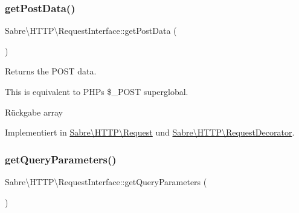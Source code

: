 \mbox{\label{interface_sabre_1_1_h_t_t_p_1_1_request_interface_ae33360454f0d43e566b76de24682af33}} 
\subsubsection{\texorpdfstring{get\+Post\+Data()}{getPostData()}}
{\footnotesize\ttfamily Sabre\textbackslash{}\+H\+T\+T\+P\textbackslash{}\+Request\+Interface\+::get\+Post\+Data (\begin{DoxyParamCaption}{ }\end{DoxyParamCaption})}

Returns the P\+O\+ST data.

This is equivalent to P\+HP\textquotesingle{}s \$\+\_\+\+P\+O\+ST superglobal.

\begin{DoxyReturn}{Rückgabe}
array 
\end{DoxyReturn}


Implementiert in \mbox{\hyperlink{class_sabre_1_1_h_t_t_p_1_1_request_ae81960877721a46ebe6fd90084a18a62}{Sabre\textbackslash{}\+H\+T\+T\+P\textbackslash{}\+Request}} und \mbox{\hyperlink{class_sabre_1_1_h_t_t_p_1_1_request_decorator_ac11069037a0860cdcdf128ee9ba307fb}{Sabre\textbackslash{}\+H\+T\+T\+P\textbackslash{}\+Request\+Decorator}}.

\mbox{\label{interface_sabre_1_1_h_t_t_p_1_1_request_interface_a9e54c49278b75692ba00bd4f5932856f}} 
\subsubsection{\texorpdfstring{get\+Query\+Parameters()}{getQueryParameters()}}
{\footnotesize\ttfamily Sabre\textbackslash{}\+H\+T\+T\+P\textbackslash{}\+Request\+Interface\+::get\+Query\+Parameters (\begin{DoxyParamCaption}{ }\end{DoxyParamCaption})}

